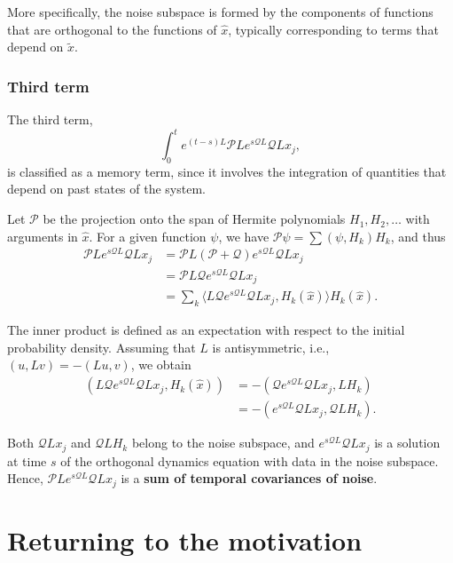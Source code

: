 \documentclass[12pt]{article}
\begin{document}
More specifically, the noise subspace is formed by the components of functions that are orthogonal to the functions of $\hat{x}$, typically corresponding to terms that depend on $\tilde{x}$.

\subsubsection{Third term}
The third term,
\begin{equation*}
	\int_0^t e^{(t-s)L} \mathcal{P}L e^{s\mathcal{Q}L} \mathcal{Q}L x_j,
\end{equation*}
is classified as a memory term, since it involves the integration of quantities that depend on past states of the system.

Let $\mathcal{P}$ be the projection onto the span of Hermite polynomials $H_1, H_2, \ldots$ with arguments in $\hat{x}$. For a given function $\psi$, we have $\mathcal{P}\psi = \sum (\psi,H_k)H_k$, and thus
\begin{align*}
	\mathcal{P}Le^{s\mathcal{Q}L}\mathcal{Q}Lx_j 
	  & = \mathcal{P}L(\mathcal{P}+\mathcal{Q})e^{s\mathcal{Q}L}\mathcal{Q}Lx_j                           \\
	  & = \mathcal{P}L\mathcal{Q}e^{s\mathcal{Q}L}\mathcal{Q}Lx_j                                         \\
	  & = \sum_k \langle L\mathcal{Q}e^{s\mathcal{Q}L}\mathcal{Q}Lx_j, H_k(\hat{x}) \rangle H_k(\hat{x}). 
\end{align*}

The inner product is defined as an expectation with respect to the initial probability density. Assuming that $L$ is antisymmetric, i.e., $(u,Lv) = -(Lu,v)$, we obtain
\begin{align*}
	(L \mathcal{Q} e^{s \mathcal{Q} L} \mathcal{Q} L x_j, H_k(\hat{x})) 
	  & = - (\mathcal{Q} e^{s \mathcal{Q} L} \mathcal{Q} L x_j, L H_k)  \\
	  & = - (e^{s \mathcal{Q} L} \mathcal{Q} L x_j, \mathcal{Q} L H_k). 
\end{align*}

Both $\mathcal{Q}Lx_j$ and $\mathcal{Q}L H_k$ belong to the noise subspace, and $e^{s \mathcal{Q} L}\mathcal{Q}Lx_j$ is a solution at time $s$ of the orthogonal dynamics equation with data in the noise subspace. Hence, $\mathcal{P}Le^{s \mathcal{Q} L}\mathcal{Q}Lx_j$ is a \textbf{sum of temporal covariances of noise}.

\newpage

\section{Returning to the motivation}
\end{document}
